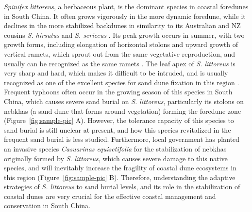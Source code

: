 \documentclass[]{interact}
\theoremstyle{plain}%
\theoremstyle{definition}
\theoremstyle{remark}
\begin{document}
\label{Introduction-4}
\textit{Spinifex littoreus}, a herbaceous plant, is the dominant species in coastal foredunes in South China. It often grows vigorously in the more dynamic foredune, while it declines in the more stabilized backdunes in similarity to its Australian and NZ cousins \textit{S. hirsutus} and \textit{S. sericeus} \citep{hespReviewBiologicalGeomorphological1989}. Its peak growth occurs in summer, with two growth forms, including elongation of horizontal stolons and upward growth of vertical ramets, which sprout out from the same vegetative reproduction, and usually can be recognized as the same ramets \citep{jacksonPopulationBiologyEvolution1985}. The leaf apex of \textit{S. littoreus} is very sharp and hard, which makes it difficult to be intruded, and is usually recognized as one of the excellent species for sand dune fixation in this region \citep{yangDiurnalvariationcharacteristics2017}. Frequent typhoons often occur in the growing season of this species in South China, which causes severe sand burial on \textit{S. littoreus}, particularly its stolons on nebkhas (a sand dune that forms around vegetation) forming the foredune zone \citep{yangDiurnalvariationcharacteristics2017}(Figure~\ref{fig:sample-pic} A). However, the tolerance capacity of this species to sand burial is still unclear at present, and how this species revitalized in the frequent sand burial is less studied. Furthermore, local government has planted an invasive species \textit{Casuarinas equisetifolia} for the stabilization of nebkhas originally formed by \textit{S. littoreus}, which causes severe damage to this native species, and will inevitably increase the fragility of coastal dune ecosystems in this region (Figure~\ref{fig:sample-pic} B). Therefore, understanding the adaptive strategies of \textit{S. littoreus} to sand burial levels, and its role in the stabilization of coastal dunes are very crucial for the effective coastal management and conservation in South China. 
\end{document}
